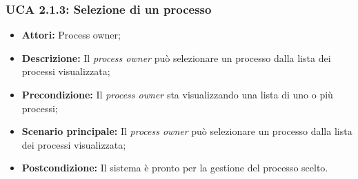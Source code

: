 \hypertarget{A2.1.3}{}
\subsubsection{UCA 2.1.3: Selezione di un processo}
\begin{itemize}
\item \textbf{Attori:} Process owner;
\item \textbf{Descrizione:} Il \textit{process owner} può selezionare un processo dalla lista dei processi visualizzata;
\item \textbf{Precondizione:} Il \textit{process owner} sta visualizzando una lista di uno o più processi;
\item \textbf{Scenario principale:} Il \textit{process owner} può selezionare un processo dalla lista dei processi visualizzata;
\item \textbf{Postcondizione:} Il sistema è pronto per la gestione del processo scelto.
\end{itemize}

\hypertarget{A2.2}{}
